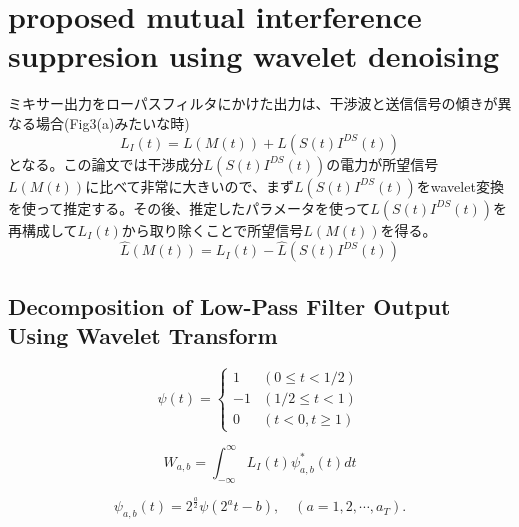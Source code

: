 \section{proposed mutual interference suppresion using wavelet denoising}
ミキサー出力をローパスフィルタにかけた出力は、干渉波と送信信号の傾きが異なる場合(Fig3(a)みたいな時)
\begin{equation}
    L_{I}(t)=L(M(t))+L\left(S(t) I^{D S}(t)\right)
\end{equation}
となる。この論文では干渉成分$L\left(S(t) I^{D S}(t)\right)$の電力が所望信号$L(M(t))$に比べて非常に大きいので、まず$L\left(S(t) I^{D S}(t)\right)$をwavelet変換を使って推定する。その後、推定したパラメータを使って$L\left(S(t) I^{D S}(t)\right)$を再構成して$L_I(t)$から取り除くことで所望信号$L(M(t))$を得る。
\begin{equation}
    \hat{L}(M(t))=L_{I}(t)-\hat{L}\left(S(t) I^{D S}(t)\right)
\end{equation}

\subsection{Decomposition of Low-Pass Filter Output Using Wavelet Transform}
\begin{equation}
    \psi(t)=\left\{\begin{array}{lc}
    1 & (0 \leq t<1 / 2) \\
    -1 & (1 / 2 \leq t<1) \\
    0 & (t<0, t \geq 1)
    \end{array}\right.
\end{equation}

\begin{equation}
    W_{a, b}=\int_{-\infty}^{\infty} L_{I}(t) \psi_{a, b}^{*}(t) d t
\end{equation}

\begin{equation}
    \psi_{a, b}(t)=2^{\frac{a}{2}} \psi\left(2^{a} t-b\right), \quad\left(a=1,2, \cdots, a_{T}\right) .
\end{equation}